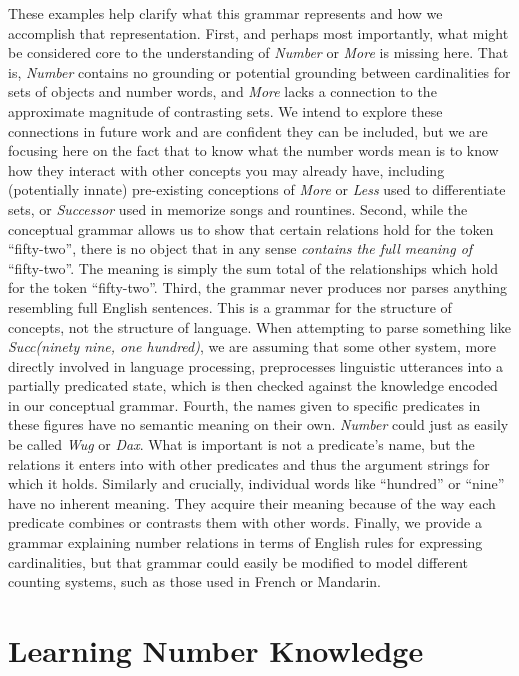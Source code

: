 \documentclass[10pt,letterpaper]{article}
\begin{document}
These examples help clarify what this grammar represents and how we
accomplish that representation. First, and perhaps most importantly,
what might be considered core to the understanding of \emph{Number} or
\emph{More} is missing here. That is, \emph{Number} contains no
grounding or potential grounding between cardinalities for sets of
objects and number words, and \emph{More} lacks a connection to
the approximate magnitude of contrasting sets. We intend to explore
these connections in future work and are confident they can be
included, but we are focusing here on the fact that to know what the
number words mean is to know how they interact with other concepts you
may already have, including (potentially innate) pre-existing
conceptions of \emph{More} or \emph{Less} used to
differentiate sets, or \emph{Successor} used in memorize songs and
rountines. Second, while the conceptual grammar allows us to show that
certain relations hold for the token ``fifty-two'', there is no object
that in any sense \emph{contains the full meaning of} ``fifty-two''.
The meaning is simply the sum total of the relationships which hold
for the token ``fifty-two''. Third, the grammar never produces nor
parses anything resembling full English sentences. This is a grammar
for the structure of concepts, not the structure of language. When
attempting to parse something like \emph{Succ(ninety nine, one
  hundred)}, we are assuming that some other system, more directly
involved in language processing, preprocesses linguistic utterances
into a partially predicated state, which is then checked against the
knowledge encoded in our conceptual grammar. Fourth, the names given
to specific predicates in these figures have no semantic meaning on
their own. \emph{Number} could just as easily be called \emph{Wug} or
\emph{Dax}. What is important is not a predicate's name, but the
relations it enters into with other predicates and thus the argument
strings for which it holds. Similarly and crucially, individual words
like ``hundred'' or ``nine'' have no inherent meaning. They acquire
their meaning because of the way each predicate combines or contrasts
them with other words. Finally, we provide a grammar explaining number
relations in terms of English rules for expressing cardinalities, but
that grammar could easily be modified to model different counting
systems, such as those used in French or Mandarin.

\section{Learning Number Knowledge}
\end{document}
